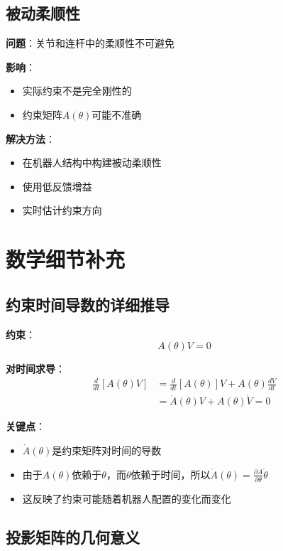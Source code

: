\documentclass[12pt,a4paper]{article}
\begin{document}
\subsection{被动柔顺性}

\textbf{问题}：关节和连杆中的柔顺性不可避免

\textbf{影响}：
\begin{itemize}
\item 实际约束不是完全刚性的
\item 约束矩阵$A(\theta)$可能不准确
\end{itemize}

\textbf{解决方法}：
\begin{itemize}
\item 在机器人结构中构建被动柔顺性
\item 使用低反馈增益
\item 实时估计约束方向
\end{itemize}

\section{数学细节补充}

\subsection{约束时间导数的详细推导}

\textbf{约束}：
\begin{equation}
A(\theta)V = 0
\end{equation}

\textbf{对时间求导}：
\begin{align}
\frac{d}{dt}[A(\theta)V] &= \frac{d}{dt}[A(\theta)]V + A(\theta)\frac{dV}{dt} \\
&= \dot{A}(\theta)V + A(\theta)\dot{V} = 0
\end{align}

\textbf{关键点}：
\begin{itemize}
\item $\dot{A}(\theta)$是约束矩阵对时间的导数
\item 由于$A(\theta)$依赖于$\theta$，而$\theta$依赖于时间，所以$\dot{A}(\theta) = \frac{\partial A}{\partial \theta}\dot{\theta}$
\item 这反映了约束可能随着机器人配置的变化而变化
\end{itemize}

\subsection{投影矩阵的几何意义}
\end{document}

